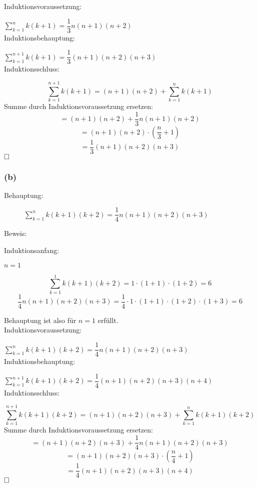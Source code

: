 \documentclass[11pt, a4paper]{article}
\begin{document}
		Induktionsvoraussetzung:

		$\sum_{k=1}^n k(k+1) = \dfrac{1}{3} n(n+1)(n+2)$ \\


		Induktionsbehauptung:

		$\sum_{k=1}^{n+1} k(k+1) = \dfrac{1}{3} (n+1)(n+2)(n+3)$ \\


		Induktionsschluss:

		\[ \sum_{k=1}^{n+1} k(k+1) = (n+1)(n+2) + \sum_{k=1}^n k(k+1) \]
		Summe durch Induktionsvoraussetzung ersetzen:
		\[ = (n+1)(n+2) + \dfrac{1}{3} n(n+1)(n+2) \]
		\[ = (n+1)(n+2) \cdot \left( \dfrac{n}{3} + 1 \right)\] 
		\[ = \dfrac{1}{3} (n+1)(n+2)(n+3) \] $\hfill \Box$


	\subsubsection*{(b)}

		\begin{description}
			\item[Behauptung:] $\sum_{k=1}^n k(k+1)(k+2) = \dfrac{1}{4} n(n+1)(n+2)(n+3)$
			\item[Beweis:]
		\end{description}

		Induktionsanfang: 

		$n=1$

		\[ \sum_{k=1}^1 k(k+1)(k+2) = 1\cdot(1+1)\cdot(1+2) = 6 \]
		\[ \dfrac{1}{4} n(n+1)(n+2)(n+3) = \dfrac{1}{4} \cdot 1\cdot (1+1) \cdot (1+2)\cdot(1+3) = 6 \]

		Behauptung ist also für $n=1$ erfüllt. \\


		Induktionsvoraussetzung:

		$\sum_{k=1}^n k(k+1)(k+2) = \dfrac{1}{4} n(n+1)(n+2)(n+3)$ \\


		Induktionsbehauptung:

		$\sum_{k=1}^{n+1} k(k+1)(k+2) = \dfrac{1}{4} (n+1)(n+2)(n+3)(n+4)$ \\


		Induktionsschluss:

		\[ \sum_{k=1}^{n+1} k(k+1)(k+2) = (n+1)(n+2)(n+3) + \sum_{k=1}^n k(k+1)(k+2) \]
		Summe durch Induktionsvoraussetzung ersetzen:
		\[ = (n+1)(n+2)(n+3) + \dfrac{1}{4} n(n+1)(n+2)(n+3)\]
		\[ = (n+1)(n+2)(n+3) \cdot \left( \dfrac{n}{4} + 1 \right)\] 
		\[= \dfrac{1}{4} (n+1)(n+2)(n+3)(n+4) \] $\hfill \Box$
\end{document}
